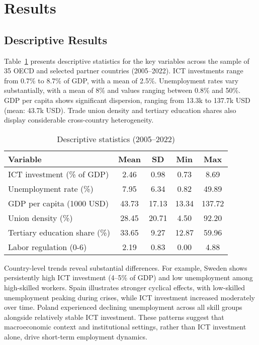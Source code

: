 

\section{Results}

\subsection{Descriptive Results}

Table~\ref{tab:summary} presents descriptive statistics for the key variables across the sample of 
35 OECD and selected partner countries (2005–2022). ICT investments range from 0.7\% to 8.7\% of GDP, 
with a mean of 2.5\%. Unemployment rates vary substantially, with a mean of 8\% and values ranging 
between 0.8\% and 50\%. GDP per capita shows significant dispersion, ranging from 13.3k to 137.7k 
USD (mean: 43.7k USD). Trade union density and tertiary education shares also display considerable 
cross-country heterogeneity.

\begin{table}[H]
\centering
\caption{Descriptive statistics (2005–2022)}
\label{tab:summary}
\begin{tabular}{lcccc}
\toprule
Variable & Mean & SD & Min & Max \\
\midrule
ICT investment (\% of GDP) & 2.46 & 0.98 & 0.73 & 8.69 \\
Unemployment rate (\%) & 7.95 & 6.34 & 0.82 & 49.89 \\
GDP per capita (1000 USD) & 43.73 & 17.13 & 13.34 & 137.72 \\
Union density (\%) & 28.45 & 20.71 & 4.50 & 92.20 \\
Tertiary education share (\%) & 33.65 & 9.27 & 12.87 & 59.96 \\
Labor regulation (0-6) & 2.19 & 0.83 & 0.00 & 4.88 \\
\bottomrule
\end{tabular}
\end{table}

Country-level trends reveal substantial differences. For example, Sweden shows persistently high ICT 
investment (4–5\% of GDP) and low unemployment among high-skilled workers. Spain illustrates stronger 
cyclical effects, with low-skilled unemployment peaking during crises, while ICT investment increased 
moderately over time. Poland experienced declining unemployment across all skill groups alongside 
relatively stable ICT investment. These patterns suggest that macroeconomic context and institutional 
settings, rather than ICT investment alone, drive short-term employment dynamics.


